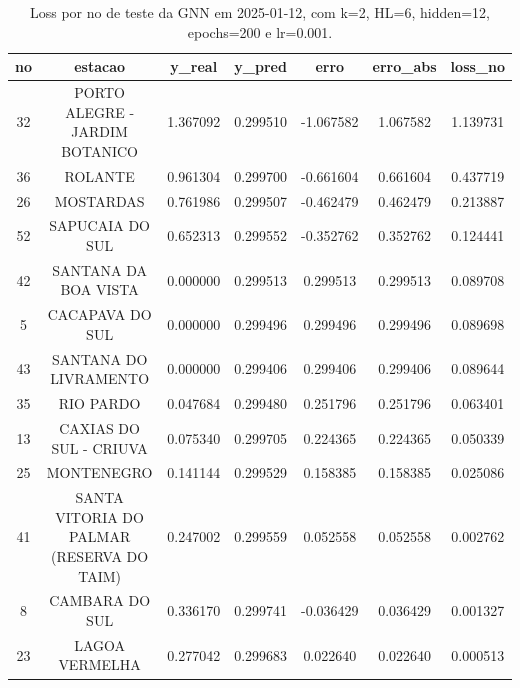 \begin{table}[h]
\centering
\caption{Loss por no de teste da GNN em 2025-01-12, com k=2, HL=6, hidden=12, epochs=200 e lr=0.001.}
\label{tab:gnn_loss_k2_hl6_h12_e200_d20250112}
\begin{tabular}{ccccccc}
\toprule
no & estacao & y\_real & y\_pred & erro & erro\_abs & loss\_no \\
\midrule
32 & PORTO ALEGRE - JARDIM BOTANICO & 1.367092 & 0.299510 & -1.067582 & 1.067582 & 1.139731 \\
36 & ROLANTE & 0.961304 & 0.299700 & -0.661604 & 0.661604 & 0.437719 \\
26 & MOSTARDAS & 0.761986 & 0.299507 & -0.462479 & 0.462479 & 0.213887 \\
52 & SAPUCAIA DO SUL & 0.652313 & 0.299552 & -0.352762 & 0.352762 & 0.124441 \\
42 & SANTANA DA BOA VISTA & 0.000000 & 0.299513 & 0.299513 & 0.299513 & 0.089708 \\
5 & CACAPAVA DO SUL & 0.000000 & 0.299496 & 0.299496 & 0.299496 & 0.089698 \\
43 & SANTANA DO LIVRAMENTO & 0.000000 & 0.299406 & 0.299406 & 0.299406 & 0.089644 \\
35 & RIO PARDO & 0.047684 & 0.299480 & 0.251796 & 0.251796 & 0.063401 \\
13 & CAXIAS DO SUL - CRIUVA & 0.075340 & 0.299705 & 0.224365 & 0.224365 & 0.050339 \\
25 & MONTENEGRO & 0.141144 & 0.299529 & 0.158385 & 0.158385 & 0.025086 \\
41 & SANTA VITORIA DO PALMAR (RESERVA DO TAIM) & 0.247002 & 0.299559 & 0.052558 & 0.052558 & 0.002762 \\
8 & CAMBARA DO SUL & 0.336170 & 0.299741 & -0.036429 & 0.036429 & 0.001327 \\
23 & LAGOA VERMELHA & 0.277042 & 0.299683 & 0.022640 & 0.022640 & 0.000513 \\
\bottomrule
\end{tabular}
\end{table}
